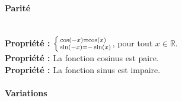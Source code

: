 \documentclass[a4paper,titlepage]{article}
\makeatletter
\let\oldleft\left
\renewcommand{\left}{\mathopen{}\mathclose\bgroup\oldleft}
\let\oldright\right
\renewcommand{\right}{\aftergroup\egroup\oldright}
\def\tikzscale{1}\begin{lrbox}{\measure@tikzpicture}
\edef\tikzscale{\pgfmathresult}
\makeatother
\begin{document}
            \paragraph{Parité}\mbox{}\\
                \textbf{Propriété :} $\left\{\begin{smallmatrix*}[l]\cos\left(-x\right)=\cos\left(x\right)\\\sin\left(-x\right)=-\sin\left(x\right)\end{smallmatrix*}\!\right.$, pour tout $x\in\mathbb{R}$.
                \\
                \textbf{Propriété :} La fonction cosinus est paire.
                \\
                \textbf{Propriété :} La fonction sinus est impaire.
            \paragraph{Variations}\mbox{}\\
                \begin{scaletikzpicturetowidth}{\textwidth}
                \end{scaletikzpicturetowidth}
\end{document}
